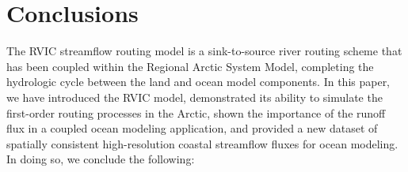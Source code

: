 \section{Conclusions}
\label{sec:conclusions_ch4}

The RVIC streamflow routing model is a sink-to-source river routing scheme that has been coupled within the Regional Arctic System Model, completing the hydrologic cycle between the land and ocean model components.
In this paper, we have introduced the RVIC model, demonstrated its ability to simulate the first-order routing processes in the Arctic, shown the  importance of the runoff flux in a coupled ocean modeling application, and provided a new dataset of spatially consistent high-resolution coastal streamflow fluxes for ocean modeling.
In doing so, we conclude the following:

